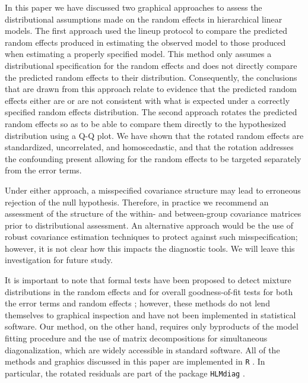 \documentclass[12pt]{article} %
\newcommand{\al}[1]{{\color{red} #1}}
\begin{document}
In this paper we have discussed two graphical approaches to assess the distributional assumptions made on the random effects in hierarchical linear models. The first approach used the lineup protocol to compare the predicted random effects produced in estimating the observed model to those produced when estimating a properly specified model. This method only assumes a distributional specification for the random effects and does not directly compare the predicted random effects to their distribution. Consequently, the conclusions that are drawn from this approach relate to evidence that the predicted random effects either are or are not {consistent} with what is expected under a correctly specified random effects distribution. The second approach rotates the predicted random effects so as to be able to compare them directly to the hypothesized distribution using a Q-Q plot. We have shown that the rotated random effects are standardized, uncorrelated, and homoscedastic, and that the rotation addresses the confounding present allowing for the random effects to be targeted separately from the error terms. 

Under either approach, a misspecified covariance structure may lead to erroneous rejection of the null hypothesis. Therefore, in practice we recommend an assessment of the structure of {the within- and between-group covariance matrices} prior to distributional assessment.
An alternative approach would be the use of robust covariance estimation techniques to protect against such misspecification; however, {it is not clear how this impacts the diagnostic tools. We will leave this investigation for future study.} %

It is important to note that formal tests have been proposed  to detect mixture distributions in the random effects \citep{Verbeke:1996va} and for overall goodness-of-fit tests for both the error terms and random effects \citep{Jiang:2001dx}; however, these methods do not lend themselves to graphical inspection and have not been implemented in statistical software. Our method, on the other hand, requires only byproducts of the model fitting procedure and the use of matrix decompositions for simultaneous diagonalization, which are widely accessible in standard software. All of the methods and graphics discussed in this paper are implemented in  \texttt{R} \citep{R}. In particular, the rotated residuals are part of the package \texttt{HLMdiag} \citep{HLMdiag, Loy:JSS}.
\end{document}
